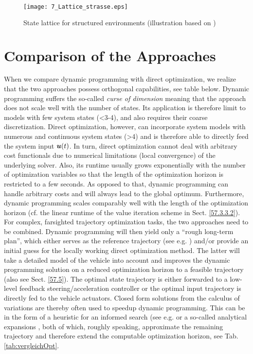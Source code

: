 \begin{figure}[h]
\centering
  	\texttt{[image: 7\_Lattice\_strasse.eps]}
	\caption[State lattice for structured environments]{State lattice for structured environments (illustration based on \cite{McNaughton2011diss})}
	\label{fig:lattice_strasse}
\end{figure}



\section{Comparison of the Approaches}\label{S:57.4}


When we compare dynamic programming with direct optimization, we realize that the two approaches possess orthogonal capabilities, see table below.
 Dynamic programming suffers the so-called \emph{curse of dimension} \cite{bellman_DP}%
  meaning that the approach does not scale well with the number of states. Its application is therefore limit to models with few system states (<3-4), and also requires their coarse discretization. Direct optimization, however, can incorporate system models with numerous and continuous system states (>4) and is therefore able to directly feed the system input $\boldsymbol{u}(t)$. In turn, direct optimization cannot deal with arbitrary cost functionals due to numerical limitations (local convergence) of the underlying solver. Also, its runtime usually grows exponentially with the number of optimization variables so that the length of the optimization horizon is restricted to a few seconds. As opposed to that, dynamic programming can handle arbitrary costs and will always lead to the global optimum. Furthermore, dynamic programming scales comparably well with the length of the optimization horizon (cf. the linear runtime of the value iteration scheme in  Sect. \ref{57.3.3.2}). 
For complex, farsighted trajectory optimization tasks, the two approaches need to be combined. Dynamic programming will then yield only a “rough long-term plan”, which either serves as the reference trajectory (see e.g.\cite{Ferguson2008, Ferguson2008b, gu2013focused} %
) and/or provide an initial guess \cite{kang2012online} %
for the locally working direct optimization method. The latter will take a detailed model of the vehicle into account and improves the dynamic programming solution on a reduced optimization horizon to a feasible trajectory (also see  Sect. \ref{57.5}). The optimal state trajectory is either forwarded to a low-level feedback steering/acceleration controller or the optimal input trajectory is directly fed to the vehicle actuators.
Closed form solutions from the calculus of variations are thereby often used to speedup dynamic programming. This can be in the form of a heuristic for an informed search (see e.g. \cite{zieglerIV08}%
 or a so-called analytical expansions \cite{dolgov2010path},%
  both of which, roughly speaking, approximate the remaining trajectory and therefore extend the computable optimization horizon, see  Tab.\,\ref{tab:vergleichOpt}.

